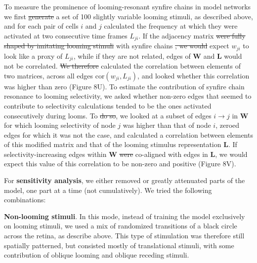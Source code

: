 \documentclass{article}
\providecommand{\DIFaddtex}[1]{{\protect\color{blue}{#1}}} %
\providecommand{\DIFdeltex}[1]{{\protect\color{red}\sout{#1}}}                      %
\providecommand{\DIFaddbegin}{} %
\providecommand{\DIFaddend}{} %
\providecommand{\DIFdelbegin}{} %
\providecommand{\DIFdelend}{} %
\providecommand{\DIFadd}[1]{\texorpdfstring{\DIFaddtex{#1}}{#1}} %
\providecommand{\DIFdel}[1]{\texorpdfstring{\DIFdeltex{#1}}{}} %
\newcommand{\DIFscaledelfig}{0.5}
\newlength{\DIFdelgraphicswidth} %
\newlength{\DIFdelgraphicsheight} %
\newcommand{\DIFaddincludegraphics}[2][]{{\color{blue}\fbox{\DIFOincludegraphics[#1]{#2}}}} %
\newcommand{\DIFdelincludegraphics}[2][]{%
\sbox{\DIFdelgraphicsbox}{\DIFOincludegraphics[#1]{#2}}%
\settoboxwidth{\DIFdelgraphicswidth}{\DIFdelgraphicsbox} %
\settoboxtotalheight{\DIFdelgraphicsheight}{\DIFdelgraphicsbox} %
\scalebox{\DIFscaledelfig}{%
\parbox[b]{\DIFdelgraphicswidth}{\usebox{\DIFdelgraphicsbox}\\[-\baselineskip] \rule{\DIFdelgraphicswidth}{0em}}\llap{\resizebox{\DIFdelgraphicswidth}{\DIFdelgraphicsheight}{%
\setlength{\unitlength}{\DIFdelgraphicswidth}%
\begin{picture}(1,1)%
\thicklines\linethickness{2pt} %
{\color[rgb]{1,0,0}\put(0,0){\framebox(1,1){}}}%
{\color[rgb]{1,0,0}\put(0,0){\line( 1,1){1}}}%
{\color[rgb]{1,0,0}\put(0,1){\line(1,-1){1}}}%
\end{picture}%
}\hspace*{3pt}}} %
} %
\DeclareRobustCommand{\DIFaddbegin}{\DIFOaddbegin \let\includegraphics\DIFaddincludegraphics} %
\DeclareRobustCommand{\DIFaddend}{\DIFOaddend \let\includegraphics\DIFOincludegraphics} %
\DeclareRobustCommand{\DIFdelbegin}{\DIFOdelbegin \let\includegraphics\DIFdelincludegraphics} %
\DeclareRobustCommand{\DIFdelend}{\DIFOaddend \let\includegraphics\DIFOincludegraphics} %
\begin{document}
To measure the prominence of looming-resonant synfire chains in model networks we first \DIFdelbegin \DIFdel{generate }\DIFdelend \DIFaddbegin \DIFadd{generated }\DIFaddend a set of 100 slightly variable looming stimuli, as described above, and for each pair of cells $i$ and $j$ calculated the frequency at which they were activated at two consecutive time frames $L_{ji}$. If the adjacency matrix \DIFdelbegin \DIFdel{were fully shaped by imitating looming stimuli }\DIFdelend \DIFaddbegin \DIFadd{is shaped as the imitation of sensory inputs }\DIFaddend with synfire chains \DIFdelbegin \DIFdel{, we would }\DIFdelend \DIFaddbegin \DIFadd{\mbox{%
\citep{clopath2010stdpcoding}}\hspace{0pt}%
, we could }\DIFaddend expect $w_{ji}$ to look like a proxy of $L_{ji}$, while if they are not related, edges of $\mathbf{W}$ and $\mathbf{L}$ would not be correlated. \DIFdelbegin \DIFdel{We therefore }\DIFdelend \DIFaddbegin \DIFadd{To quantify that, we }\DIFaddend calculated the correlation between elements of two matrices, across all edges $\text{cor}(w_{ji},L_{ji})$, and looked whether this correlation was higher than zero (Figure 8U). To estimate the contribution of synfire chain resonance to looming selectivity, we asked whether non-zero edges that seemed to contribute to selectivity calculations tended to be the ones activated consecutively during looms. To \DIFdelbegin \DIFdel{do so}\DIFdelend \DIFaddbegin \DIFadd{answer this question}\DIFaddend , we looked at a subset of edges $i \rightarrow j$ in $\mathbf{W}$ for which looming selectivity of node $j$ was higher than that of node $i$, zeroed edges for which it was not the case, and calculated a correlation between elements of this modified matrix and that of the looming stimulus representation $\mathbf{L}$. If selectivity-increasing edges within $\mathbf{W}$ \DIFdelbegin \DIFdel{were }\DIFdelend \DIFaddbegin \DIFadd{are }\DIFaddend co-aligned with edges in $\mathbf{L}$, we would expect this value of this correlation to be non-zero and positive (Figure 8V).

For \textbf{sensitivity analysis}, we either removed or greatly attenuated parts of the model, one part at a time (not cumulatively). We tried the following combinations:

\textbf{Non-looming stimuli}. In this mode, instead of training the model exclusively on looming stimuli, we used a mix of randomized transitions of a black circle across the retina, as describe above. This type of stimulation was therefore still spatially patterned, but consisted mostly of translational stimuli, with some contribution of oblique looming and oblique receding stimuli.
\end{document}
